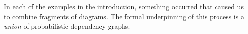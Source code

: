\documentclass{article}
\newcommand{\modelname}{probabilistic dependency graph}
\newcommand{\modelnames}{\modelname s}
\numberwithin{equation}{section}
\begin{document}
{%
	In each of the examples in the introduction, something occurred that caused us to combine fragments of diagrams. The formal underpinning of this process is a \emph{union} of \modelnames.

}
\end{document}
